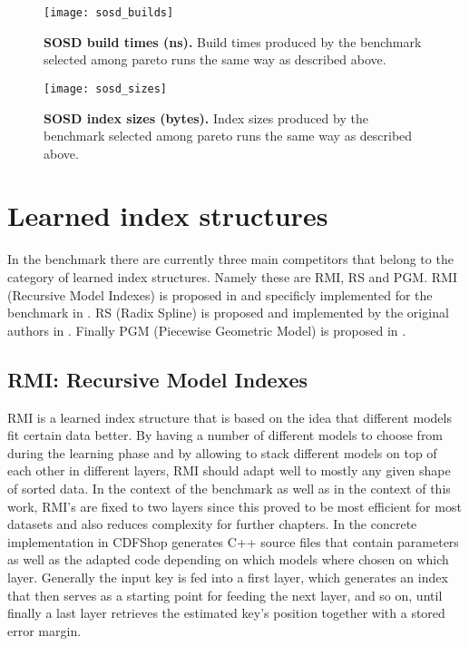\begin{figure}[ht]
\centering
\texttt{[image: sosd\_builds]}
\caption[SOSD Build Times]{
  \textbf{SOSD build times (ns).}
  Build times produced by the benchmark selected among pareto runs the same way as described above.
}
\label{fig:sosd_builds}
\end{figure}

\begin{figure}[ht]
\centering
\texttt{[image: sosd\_sizes]}
\caption[SOSD index sizes]{
  \textbf{SOSD index sizes (bytes).}
  Index sizes produced by the benchmark selected among pareto runs the same way as described above.
}
\label{fig:sosd_sizes}
\end{figure}

\section{Learned index structures}
In the benchmark there are currently three main competitors that belong to the category of learned index structures. Namely these are RMI, RS and PGM. RMI (Recursive Model Indexes) is proposed in \cite{rmi} and specificly implemented for the benchmark in \cite{cdfshop}. RS (Radix Spline) is proposed and implemented by the original authors in \cite{radixspline}. Finally PGM (Piecewise Geometric Model) is proposed in \cite{pgm}.

\subsection{RMI: Recursive Model Indexes}
\label{sect:background:rmi}
RMI \cite{rmi} is a learned index structure that is based on the idea that different models fit certain data better. By having a number of different models to choose from during the learning phase and by allowing to stack different models on top of each other in different layers, RMI should adapt well to mostly any given shape of sorted data. In the context of the benchmark as well as in the context of this work, RMI's are fixed to two layers since this proved to be most efficient for most datasets and also reduces complexity for further chapters. In the concrete implementation in \cite{cdfshop} CDFShop generates C++ source files that contain parameters as well as the adapted code depending on which models where chosen on which layer. Generally the input key is fed into a first layer, which generates an index that then serves as a starting point for feeding the next layer, and so on, until finally a last layer retrieves the estimated key's position together with a stored error margin.\\

